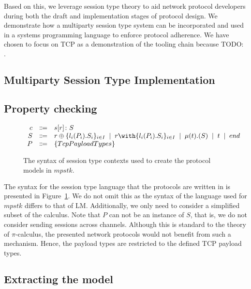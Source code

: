 \documentclass{article}
\newcommand{\todo}[1]{}
\renewcommand{\todo}[1]{{\color{red} TODO: {#1}}}
\newcommand{\sep}{\;\mid\;}
\begin{document}
Based on this, we leverage session type theory to aid network protocol developers during both the draft and implementation stages of protocol design.
We demonstrate how a multiparty session type system can be incorporated and used in a systems programming language to enforce protocol adherence.
We have chosen to focus on TCP as a demonstration of the tooling chain because \todo.

\subsection{Multiparty Session Type Implementation}

\subsection{Property checking}

\begin{figure}[H]
    \centering
        $
        \begin{array}{rcll}
        \ensuremath{c} & \Coloneqq & \ensuremath{s[r] \colon S} \\
        \ensuremath{S}
            & \Coloneqq & \ensuremath{r \oplus \{l_i(P_i).S_i\}_{i \in I}}
            \sep        \ensuremath{r \with \{l_i(P_i).S_i\}_{i \in I}}
            \sep        \ensuremath{\mu(t).(S)}
            \sep        \ensuremath{t}
            \sep        \ensuremath{end} \\
        \ensuremath{P}
            & \Coloneqq & \ensuremath{\{TcpPayloadTypes\}}
        \end{array}
        $
    \caption{The syntax of session type contexts used to create the protocol models in \ensuremath{mpstk}.} \label{fig:syntax}
\end{figure}

The syntax for the session type language that the protocols are written in is presented in Figure~\ref{fig:syntax}.
We do not omit this as the syntax of the language used for \ensuremath{mpstk} differs to that of LM.
Additionally, we only need to consider a simplified subset of the calculus.
Note that \ensuremath{P} can not be an instance of \ensuremath{S}, that is, we do not consider sending sessions across channels.
Although this is standard to the theory of \ensuremath{\pi}-calculus, the presented network protocols would not benefit from such a mechanism.
Hence, the payload types are restricted to the defined TCP payload types.

\subsection{Extracting the model}
\end{document}
